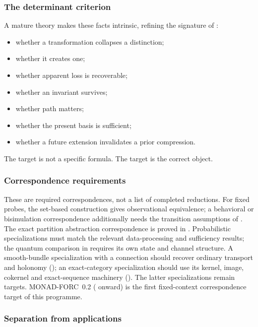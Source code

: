 \subsubsection{The determinant criterion}

A mature theory makes these facts intrinsic, refining the signature
of :
\begin{itemize}
  \item whether a transformation collapses a distinction;
  \item whether it creates one;
  \item whether apparent loss is recoverable;
  \item whether an invariant survives;
  \item whether path matters;
  \item whether the present basis is sufficient;
  \item whether a future extension invalidates a prior compression.
\end{itemize}
The target is not a specific formula. The target is the correct
object.

\subsubsection{Correspondence requirements}

These are required correspondences, not a list of completed reductions.
For fixed probes, the set-based construction gives observational
equivalence; a behavioral or bisimulation correspondence additionally
needs the transition assumptions of . The exact
partition abstraction correspondence is proved in
.
Probabilistic specializations must match the relevant data-processing
and sufficiency results; the quantum comparison in 
requires its own state and channel structure. A smooth-bundle
specialization with a connection should recover ordinary transport and
holonomy (); an exact-category specialization should
use its kernel, image, cokernel and exact-sequence machinery
(). The latter specializations remain targets.
MONAD-FORC~0.2
( onward) is the first fixed-context
correspondence target of this programme.

\subsubsection{Separation from applications}

